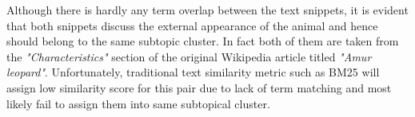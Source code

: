\documentclass[sigconf,authordraft]{acmart}
\begin{document}
Although there is hardly any term overlap between the text snippets, it is evident that both snippets discuss the external appearance of the animal and hence should belong to the same subtopic cluster. In fact both of them are taken from the \textit{"Characteristics"} section of the original Wikipedia article titled \textit{"Amur leopard"}. Unfortunately, traditional text similarity metric such as BM25 will assign low similarity score for this pair due to lack of term matching and most likely fail to assign them into same subtopical cluster.




\end{document}
